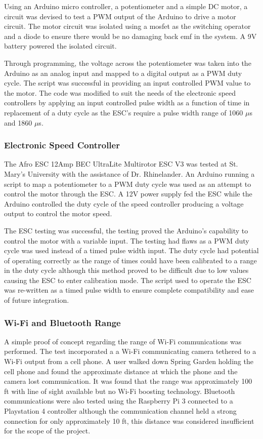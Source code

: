 Using an Arduino micro controller, a potentiometer and a simple DC motor, a circuit was devised to test a PWM output of the Arduino to drive a motor circuit. The motor circuit was isolated using a mosfet as the switching operator and a diode to ensure there would be no damaging back emf in the system. A 9V battery powered the isolated circuit.
  
Through programming, the voltage across the potentiometer was taken into the Arduino as an analog input and mapped to a digital output as a PWM duty cycle. The script was successful in providing an input controlled PWM value to the motor. The code was modified to suit the needs of the electronic speed controllers by applying an input controlled pulse width as a function of time in replacement of a duty cycle as the ESC's require a pulse width range of 1060 $\mu$s and 1860 $\mu$s.
  
  \subsubsection{Electronic Speed Controller}
  
The Afro ESC 12Amp BEC UltraLite Multirotor ESC V3 was tested at St. Mary's University with the assistance of Dr. Rhinelander. An Arduino running a script to map a potentiometer to a PWM duty cycle was used as an attempt to control the motor through the ESC. A 12V power supply fed the ESC while the Arduino controlled the duty cycle of the speed controller producing a voltage output to control the motor speed. 

The ESC testing was successful, the testing proved the Arduino's capability to control the motor with a variable input. The testing had flaws as a PWM duty cycle was used instead of a timed pulse width input. The duty cycle had potential of operating correctly as the range of times could have been calibrated to a range in the duty cycle although this method proved to be difficult due to low values causing the ESC to enter calibration mode. The script used to operate the ESC was re-written as a timed pulse width to ensure complete compatibility and ease of future integration.

  \subsubsection{Wi-Fi and Bluetooth Range}
  
  A simple proof of concept regarding the range of Wi-Fi communications was performed. The test incorporated a a Wi-Fi communicating camera tethered to a Wi-Fi output from a cell phone. A user walked down Spring Garden holding the cell phone and found the approximate distance at which the phone and the camera lost communication. It was found that the range was approximately 100 ft with line of sight available but no Wi-Fi boosting technology. Bluetooth communications were also tested using the Raspberry Pi 3 connected to a Playstation 4 controller although the communication channel held a strong connection for only approximately 10 ft, this distance was considered insufficient for the scope of the project.
  
